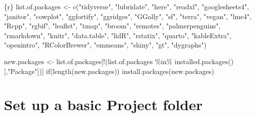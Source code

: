 \documentclass[
  letterpaper,
  DIV=11,
  numbers=noendperiod]{scrreprt}
\newenvironment{Shaded}{\begin{snugshade}}{\end{snugshade}}
\newcommand{\InformationTok}[1]{\textcolor[rgb]{0.37,0.37,0.37}{#1}}
\begin{document}
\begin{Shaded}
\begin{Highlighting}[]
\InformationTok{\textasciigrave{}\textasciigrave{}\textasciigrave{}\{r\}}
\InformationTok{list.of.packages \textless{}{-} c("tidyverse",}
\InformationTok{                      "lubridate",}
\InformationTok{                      "here",}
\InformationTok{                      "readxl",}
\InformationTok{                      "googlesheets4",}
\InformationTok{                      "janitor",}
\InformationTok{                      "cowplot",}
\InformationTok{                      "ggfortify",}
\InformationTok{                      "ggridges",}
\InformationTok{                      "GGally",}
\InformationTok{                      "sf",}
\InformationTok{                      "terra",}
\InformationTok{                      "vegan",}
\InformationTok{                      "lme4", }
\InformationTok{                      "Rcpp",}
\InformationTok{                      "rgbif",}
\InformationTok{                      "leaflet",}
\InformationTok{                      "tmap",}
\InformationTok{                      "broom",}
\InformationTok{                      "remotes",}
\InformationTok{                      "palmerpenguins",}
\InformationTok{                      "rmarkdown",}
\InformationTok{                      "knitr",}
\InformationTok{                      "data.table",}
\InformationTok{                      "lidR",}
\InformationTok{                      "rstatix",}
\InformationTok{                      "quarto",}
\InformationTok{                      "kableExtra",}
\InformationTok{                      "openintro",}
\InformationTok{                      "RColorBrewer",}
\InformationTok{                      "emmeans",}
\InformationTok{                      "shiny",}
\InformationTok{                      "gt",}
\InformationTok{                      "dygraphs")}

\InformationTok{new.packages \textless{}{-} list.of.packages[!(list.of.packages \%in\% installed.packages()[,"Package"])]}
\InformationTok{if(length(new.packages)) install.packages(new.packages)}
\InformationTok{\textasciigrave{}\textasciigrave{}\textasciigrave{}}
\end{Highlighting}
\end{Shaded}

\chapter{Set up a basic Project
folder}\label{set-up-a-basic-project-folder}
\end{document}
